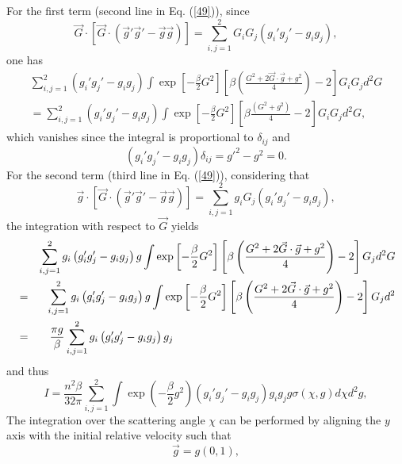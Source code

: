 \documentclass[11pt]{article} %
\begin{document}
For the first term (second line in Eq. (\ref{49})), since 
\[\vec{G}\cdot\left[\vec{G}\cdot\left(\vec{g}'\vec{g}'-\vec{g}\vec{g}\right)\right]=\sum_{i,j=1}^{2}G_{i}G_{j}\left(g_{i}'g_{j}'-g_{i}g_{j}\right),\]
one has
{\small 
\begin{eqnarray}
\sum_{i,j=1}^{2}\left(g_{i}'g_{j}'-g_{i}g_{j}\right)\int\exp\left[-\frac{\beta}{2}G^{2}\right]\left[\beta\left(\frac{G^{2}+2\vec{G}\cdot\vec{g}+g^{2}}{4}\right)-2\right]G_{i}G_{j}d^{2}G \nonumber\\
=\sum_{i,j=1}^{2}\left(g_{i}'g_{j}'-g_{i}g_{j}\right)\int\exp\left[-\frac{\beta}{2}G^{2}\right]\left[\beta\frac{\left(G^{2}+g^{2}\right)}{4}-2\right]G_{i}G_{j}d^{2}G,\label{50} 
\end{eqnarray}}
which vanishes since the integral is proportional to $\delta_{ij}$
and 
\begin{equation}
\left(g_{i}'g_{j}'-g_{i}g_{j}\right)\delta_{ij}=g'^{2}-g^{2}=0.\label{51}
\end{equation}
For the second term (third line in Eq. (\ref{49})), considering that
\[\vec{g}\cdot\left[\vec{G}\cdot\left(\vec{g}'\vec{g}'-\vec{g}\vec{g}\right)\right]=\sum_{i,j=1}^{2}g_{i}G_{j}\left(g_{i}'g_{j}'-g_{i}g_{j}\right),\]
the integration with respect to $\vec{G}$ yields 
{\small
\begin{eqnarray}
& &\sum_{i,j=1}^{2}g_{i}\left(g_{i}'g_{j}'-g_{i}g_{j}\right)g\int\exp\left[-\frac{\beta}{2}G^{2}\right]\left[\beta\left(\frac{G^{2}+2\vec{G}\cdot\vec{g}+g^{2}}{4}\right)-2\right]G_{j}d^{2}G\nonumber \\
&=&\sum_{i,j=1}^{2}g_{i}\left(g_{i}'g_{j}'-g_{i}g_{j}\right)g\int\exp\left[-\frac{\beta}{2}G^{2}\right]\left[\beta\left(\frac{G^{2}+2\vec{G}\cdot\vec{g}+g^{2}}{4}\right)-2\right]G_{j}d^{2}\label{eq:4448}\\
&=&\frac{\pi g}{\beta}\sum_{i,j=1}^{2}g_{i}\left(g_{i}'g_{j}'-g_{i}g_{j}\right)g_{j} \hspace{7.05cm} \nonumber 
\end{eqnarray}}
and thus 
\begin{equation}
I=\frac{n^{2}\beta}{32\pi}\sum_{i,j=1}^{2}\int\exp\left(-\frac{\beta}{2}g^{2}\right)\left(g_{i}'g_{j}'-g_{i}g_{j}\right)g_{i}g_{j}g\sigma\left(\chi,g\right)d\chi d^{2}g,\label{53}
\end{equation}
The integration over the scattering angle $\chi$ can be performed
by aligning the $y$ axis with the initial relative velocity such
that 
\begin{equation}
\vec{g}=g\left(0,1\right),\label{54}
\end{equation}
\end{document}
